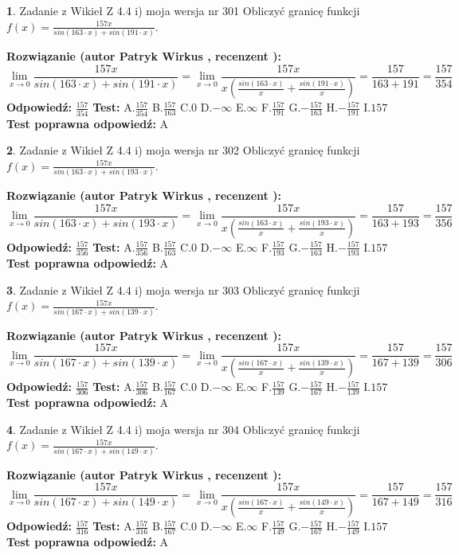 \documentclass[12pt, a4paper]{article}
\theoremstyle{definition} %
\newtheorem{zad}{}
\newcommand{\zadStart}[1]{\begin{zad}#1\newline}
\newcommand{\zadStop}{\end{zad}}
\newcommand{\rozwStart}[2]{\noindent \textbf{Rozwiązanie (autor #1 , recenzent #2): }\newline}
\newcommand{\rozwStop}{\newline}
\newcommand{\odpStart}{\noindent \textbf{Odpowiedź:}\newline}
\newcommand{\odpStop}{\newline}
\newcommand{\testStart}{\noindent \textbf{Test:}\newline}
\newcommand{\testStop}{\newline}
\newcommand{\kluczStart}{\noindent \textbf{Test poprawna odpowiedź:}\newline}
\newcommand{\kluczStop}{\newline}
\begin{document}
\zadStart{Zadanie z Wikieł Z 4.4 i) moja wersja nr 301}
Obliczyć granicę funkcji $f(x)=\frac{157x}{sin(163\cdot x) +sin(191\cdot x)}$.
\zadStop
\rozwStart{Patryk Wirkus}{}
$$\lim\limits_{x\to 0}\frac{157x}{sin(163\cdot x) +sin(191\cdot x)}=\lim\limits_{x\to 0}\frac{157x}{x(\frac{sin(163\cdot x)}{x}+\frac{sin(191\cdot x)}{x})}=\frac{157}{163+191} = \frac{157}{354}$$
\rozwStop
\odpStart
$\frac{157}{354}$
\odpStop
\testStart
A.$\frac{157}{354}$
B.$\frac{157}{163}$
C.$0$
D.$-\infty$
E.$\infty$
F.$\frac{157}{191}$
G.$-\frac{157}{163}$
H.$-\frac{157}{191}$
I.$157$
\testStop
\kluczStart
A
\kluczStop



\zadStart{Zadanie z Wikieł Z 4.4 i) moja wersja nr 302}
Obliczyć granicę funkcji $f(x)=\frac{157x}{sin(163\cdot x) +sin(193\cdot x)}$.
\zadStop
\rozwStart{Patryk Wirkus}{}
$$\lim\limits_{x\to 0}\frac{157x}{sin(163\cdot x) +sin(193\cdot x)}=\lim\limits_{x\to 0}\frac{157x}{x(\frac{sin(163\cdot x)}{x}+\frac{sin(193\cdot x)}{x})}=\frac{157}{163+193} = \frac{157}{356}$$
\rozwStop
\odpStart
$\frac{157}{356}$
\odpStop
\testStart
A.$\frac{157}{356}$
B.$\frac{157}{163}$
C.$0$
D.$-\infty$
E.$\infty$
F.$\frac{157}{193}$
G.$-\frac{157}{163}$
H.$-\frac{157}{193}$
I.$157$
\testStop
\kluczStart
A
\kluczStop



\zadStart{Zadanie z Wikieł Z 4.4 i) moja wersja nr 303}
Obliczyć granicę funkcji $f(x)=\frac{157x}{sin(167\cdot x) +sin(139\cdot x)}$.
\zadStop
\rozwStart{Patryk Wirkus}{}
$$\lim\limits_{x\to 0}\frac{157x}{sin(167\cdot x) +sin(139\cdot x)}=\lim\limits_{x\to 0}\frac{157x}{x(\frac{sin(167\cdot x)}{x}+\frac{sin(139\cdot x)}{x})}=\frac{157}{167+139} = \frac{157}{306}$$
\rozwStop
\odpStart
$\frac{157}{306}$
\odpStop
\testStart
A.$\frac{157}{306}$
B.$\frac{157}{167}$
C.$0$
D.$-\infty$
E.$\infty$
F.$\frac{157}{139}$
G.$-\frac{157}{167}$
H.$-\frac{157}{139}$
I.$157$
\testStop
\kluczStart
A
\kluczStop



\zadStart{Zadanie z Wikieł Z 4.4 i) moja wersja nr 304}
Obliczyć granicę funkcji $f(x)=\frac{157x}{sin(167\cdot x) +sin(149\cdot x)}$.
\zadStop
\rozwStart{Patryk Wirkus}{}
$$\lim\limits_{x\to 0}\frac{157x}{sin(167\cdot x) +sin(149\cdot x)}=\lim\limits_{x\to 0}\frac{157x}{x(\frac{sin(167\cdot x)}{x}+\frac{sin(149\cdot x)}{x})}=\frac{157}{167+149} = \frac{157}{316}$$
\rozwStop
\odpStart
$\frac{157}{316}$
\odpStop
\testStart
A.$\frac{157}{316}$
B.$\frac{157}{167}$
C.$0$
D.$-\infty$
E.$\infty$
F.$\frac{157}{149}$
G.$-\frac{157}{167}$
H.$-\frac{157}{149}$
I.$157$
\testStop
\kluczStart
A
\kluczStop
\end{document}
